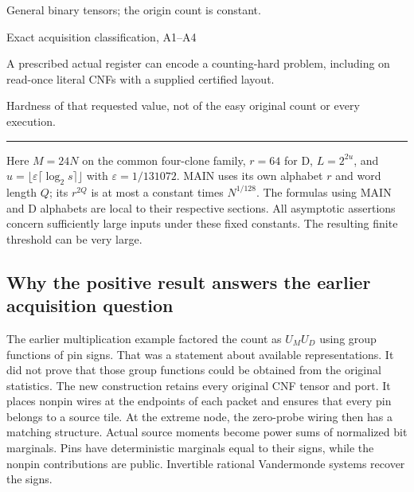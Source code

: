 \documentclass[11pt,a4paper]{article}
\newlength{\OfflineResearchTableWidth}
\newcommand{\OfflineResearchHeaderRule}{\noindent\rule{\linewidth}{0.45pt}\par}
\newcommand{\OfflineResearchRow}{\par}
\newenvironment{OfflineResearchTable}{%
  \par\medskip\begingroup\small\setlength{\parindent}{0pt}%
  \setlength{\parskip}{3pt plus 1pt minus .5pt}%
  \setlength{\OfflineResearchTableWidth}{\linewidth}%
}{%
  \par\endgroup\medskip%
}
\begin{document}
\begin{OfflineResearchTable}
\begin{minipage}[t]{0.31500\OfflineResearchTableWidth}\raggedright
General binary tensors; the origin count is
constant.
\end{minipage}%
\OfflineResearchRow
\noindent%
\begin{minipage}[t]{0.31500\OfflineResearchTableWidth}\raggedright
Exact acquisition classification, A1--A4
\end{minipage}\hfill%
\begin{minipage}[t]{0.31500\OfflineResearchTableWidth}\raggedright
A prescribed actual register
can encode a counting-hard problem, including on read-once literal CNFs
with a supplied certified layout.
\end{minipage}\hfill%
\begin{minipage}[t]{0.31500\OfflineResearchTableWidth}\raggedright
Hardness of that requested value,
not of the easy original count or every execution.
\end{minipage}%
\OfflineResearchRow
\OfflineResearchHeaderRule
\end{OfflineResearchTable}

Here \(M=24N\) on the common four-clone family, \(r=64\) for D,
\(L=2^{2u}\), and \(u=\lfloor\varepsilon\lceil\log_2s\rceil\rfloor\)
with \(\varepsilon=1/131072\). MAIN uses its own alphabet \(r\) and word
length \(Q\); its \(r^{2Q}\) is at most a constant times \(N^{1/128}\).
The formulas using MAIN and D alphabets are local to their respective
sections. All asymptotic assertions concern sufficiently large inputs
under these fixed constants. The resulting finite threshold can be very
large.

\subsection{Why the positive result answers the earlier acquisition
question}\label{v9-why-the-positive-result-answers-the-earlier-acquisition-question}

The earlier multiplication example factored the count as \(U_MU_D\)
using group functions of pin signs. That was a statement about available
representations. It did not prove that those group functions could be
obtained from the original statistics. The new construction retains
every original CNF tensor and port. It places nonpin wires at the
endpoints of each packet and ensures that every pin belongs to a source
tile. At the extreme node, the zero-probe wiring then has a matching
structure. Actual source moments become power sums of normalized bit
marginals. Pins have deterministic marginals equal to their signs, while
the nonpin contributions are public. Invertible rational Vandermonde
systems recover the signs.
\end{document}

